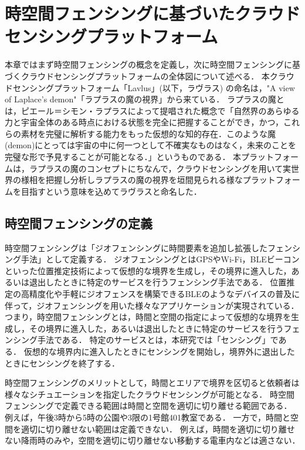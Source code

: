 \chapter{時空間フェンシングに基づいたクラウドセンシングプラットフォーム}
\thispagestyle{myheadings}
本章ではまず時空間フェンシングの概念を定義し，次に時空間フェンシングに基づくクラウドセンシングプラットフォームの全体図について述べる．
本クラウドセンシングプラットフォーム「Lavlus」(以下，ラヴラス) の命名は，"A view of Laplace's demon"「ラプラスの魔の視界」から来ている．
ラプラスの魔とは，ピエール＝シモン・ラプラスによって提唱された概念で「自然界のあらゆる力と宇宙全体のある時点における状態を完全に把握することができ，かつ，これらの素材を完璧に解析する能力をもった仮想的な知的存在．このような魔(demon)にとっては宇宙の中に何一つとして不確実なものはなく，未来のことを完璧な形で予見することが可能となる．」\cite{ziten}というものである．
本プラットフォームは，ラプラスの魔のコンセプトにちなんで，クラウドセンシングを用いて実世界の様相を把握し分析しラプラスの魔の視界を垣間見られる様なプラットフォームを目指すという意味を込めてラヴラスと命名した．

\section{時空間フェンシングの定義}
\label{STF}
時空間フェンシングは「ジオフェンシングに時間要素を追加し拡張したフェンシング手法」として定義する．
ジオフェンシングとはGPSやWi-Fi，BLEビーコンといった位置推定技術によって仮想的な境界を生成し，その境界に進入した，あるいは退出したときに特定のサービスを行うフェンシング手法である．
位置推定の高精度化や手軽にジオフェンスを構築できるBLEのようなデバイスの普及に伴って，ジオフェンシングを用いた様々なアプリケーションが実現されている．
つまり，時空間フェンシングとは，時間と空間の指定によって仮想的な境界を生成し，その境界に進入した，あるいは退出したときに特定のサービスを行うフェンシング手法である．
特定のサービスとは，本研究では「センシング」である．
仮想的な境界内に進入したときにセンシングを開始し，境界外に退出したときにセンシングを終了する．

時空間フェンシングのメリットとして，時間とエリアで境界を区切ると依頼者は様々なシチュエーションを指定したクラウドセンシングが可能となる．
時空間フェンシングで定義できる範囲は時間と空間を適切に切り離せる範囲である．
例えば，午後3時から5時の公園や3限の1号館401教室である．
一方で，時間と空間を適切に切り離せない範囲は定義できない．
例えば，時間を適切に切り離せない降雨時のみや，空間を適切に切り離せない移動する電車内などは適さない．

